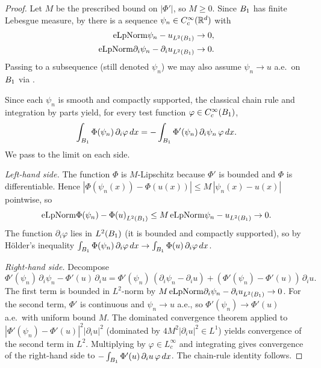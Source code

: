 \begin{proof}
\leanok
{}

Let $M$ be the prescribed bound on $|\Phi'|$, so $M \ge 0$. Since $B_{1}$ has
finite Lebesgue measure, by 
there is a sequence $\psi_n \in C^{\infty}_c(\mathbb{R}^d)$ with
\begin{align*}
\mathrm{eLpNorm}{\psi_n - u}_{L^2(B_{1})} &\to 0,\\
\mathrm{eLpNorm}{\partial_i \psi_n - \partial_i u}_{L^2(B_{1})} &\to 0.
\end{align*}
Passing to a subsequence (still denoted $\psi_n$) we may also assume $\psi_n
\to u$ a.e.\ on $B_{1}$ via
.

Since each $\psi_n$ is smooth and compactly supported, the classical chain
rule and integration by parts yield, for every test function
$\varphi \in C^{\infty}_c(B_{1})$,
\begin{multline*}
\int_{B_{1}} \Phi(\psi_n)\, \partial_i \varphi \,dx
= -\int_{B_{1}} \Phi'(\psi_n)\, \partial_i \psi_n\, \varphi \,dx.
\end{multline*}
We pass to the limit on each side.

\emph{Left-hand side.} The function $\Phi$ is $M$-Lipschitz because $\Phi'$
is bounded and $\Phi$ is differentiable. Hence
$|\Phi(\psi_n(x)) - \Phi(u(x))| \le M\, |\psi_n(x)-u(x)|$ pointwise, so
\begin{equation*}
\mathrm{eLpNorm}{\Phi(\psi_n)-\Phi(u)}_{L^2(B_{1})}
\le M\, \mathrm{eLpNorm}{\psi_n - u}_{L^2(B_{1})}
\to 0.
\end{equation*}
The function $\partial_i \varphi$ lies in $L^2(B_{1})$ (it is bounded and
compactly supported), so by H\"older's inequality
$\int_{B_{1}} \Phi(\psi_n)\,\partial_i \varphi \,dx \to
\int_{B_{1}} \Phi(u)\,\partial_i\varphi \,dx$.

\emph{Right-hand side.} Decompose
\begin{equation*}
\Phi'(\psi_n)\,\partial_i \psi_n - \Phi'(u)\,\partial_i u
= \Phi'(\psi_n)\,(\partial_i \psi_n - \partial_i u)
+ (\Phi'(\psi_n) - \Phi'(u))\,\partial_i u.
\end{equation*}
The first term is bounded in $L^2$-norm by
$M\,\mathrm{eLpNorm}{\partial_i \psi_n - \partial_i u}_{L^2(B_{1})}\to 0$.
For the second term, $\Phi'$ is continuous and $\psi_n \to u$ a.e., so
$\Phi'(\psi_n) \to \Phi'(u)$ a.e.\ with uniform bound $M$. The dominated
convergence theorem applied to $|\Phi'(\psi_n) - \Phi'(u)|^2 |\partial_i u|^2$
(dominated by $4M^2 |\partial_i u|^2 \in L^1$) yields convergence of the
second term in $L^2$. Multiplying by $\varphi \in L^\infty_c$ and integrating
gives convergence of the right-hand side to
$-\int_{B_{1}} \Phi'(u)\,\partial_i u\, \varphi\,dx$. The chain-rule
identity follows.
\end{proof}

